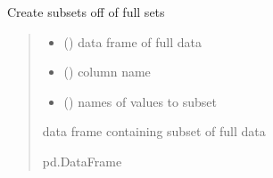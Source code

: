 \documentclass[letterpaper,10pt,english]{sphinxmanual}
\begin{document}
\begin{fulllineitems}
\label{\detokenize{src.models.electricity.scripts.preprocessor:src.models.electricity.scripts.preprocessor.create_subsets}}
\pysigstartsignatures
\pysiglinewithargsret
{}
{\sphinxparamcomma {}\sphinxparamcomma {}}
{}
\pysigstopsignatures
\sphinxAtStartPar
Create subsets off of full sets
\begin{quote}\begin{description}
\begin{itemize}
\item {} 
\sphinxAtStartPar
{} () \textendash{} data frame of full data

\item {} 
\sphinxAtStartPar
{} () \textendash{} column name

\item {} 
\sphinxAtStartPar
{} (\sphinxstyleliteralemphasis{\sphinxupquote{{[}}}\sphinxstyleliteralemphasis{\sphinxupquote{{]}}}) \textendash{} names of values to subset

\end{itemize}

\sphinxAtStartPar
data frame containing subset of full data

\sphinxAtStartPar
pd.DataFrame

\end{description}\end{quote}

\end{fulllineitems}

\end{document}
